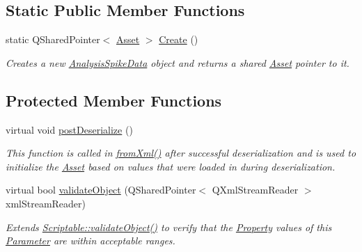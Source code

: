 \subsection*{Static Public Member Functions}
\begin{DoxyCompactItemize}
\item 
\hypertarget{class_picto_1_1_analysis_spike_data_a227d6b13cb2ab02d8b2db13160ffed58}{static Q\-Shared\-Pointer$<$ \hyperlink{class_picto_1_1_asset}{Asset} $>$ \hyperlink{class_picto_1_1_analysis_spike_data_a227d6b13cb2ab02d8b2db13160ffed58}{Create} ()}\label{class_picto_1_1_analysis_spike_data_a227d6b13cb2ab02d8b2db13160ffed58}

\begin{DoxyCompactList}\small\item\em Creates a new \hyperlink{class_picto_1_1_analysis_spike_data}{Analysis\-Spike\-Data} object and returns a shared \hyperlink{class_picto_1_1_asset}{Asset} pointer to it. \end{DoxyCompactList}\end{DoxyCompactItemize}
\subsection*{Protected Member Functions}
\begin{DoxyCompactItemize}
\item 
virtual void \hyperlink{class_picto_1_1_analysis_spike_data_acfd1de9308e3d86b1109a4e7724e588b}{post\-Deserialize} ()
\begin{DoxyCompactList}\small\item\em This function is called in \hyperlink{class_picto_1_1_asset_a8bed4da09ecb1c07ce0dab313a9aba67}{from\-Xml()} after successful deserialization and is used to initialize the \hyperlink{class_picto_1_1_asset}{Asset} based on values that were loaded in during deserialization. \end{DoxyCompactList}\item 
virtual bool \hyperlink{class_picto_1_1_analysis_spike_data_a3e7553a7a5af76724b70500418e1fe25}{validate\-Object} (Q\-Shared\-Pointer$<$ Q\-Xml\-Stream\-Reader $>$ xml\-Stream\-Reader)
\begin{DoxyCompactList}\small\item\em Extends \hyperlink{class_picto_1_1_scriptable_ab6e2944c43a3b5d418bf7b251594386d}{Scriptable\-::validate\-Object()} to verify that the \hyperlink{class_picto_1_1_property}{Property} values of this \hyperlink{class_picto_1_1_parameter}{Parameter} are within acceptable ranges. \end{DoxyCompactList}\end{DoxyCompactItemize}
